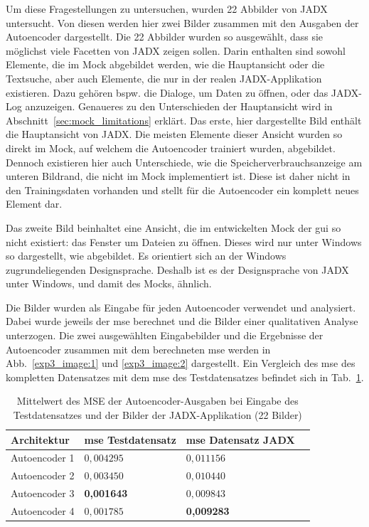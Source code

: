 Um diese Fragestellungen zu untersuchen, wurden 22 Abbilder von JADX untersucht. Von diesen werden hier zwei Bilder zusammen mit den Ausgaben der Autoencoder dargestellt. Die 22 Abbilder wurden so ausgewählt, dass sie möglichst viele Facetten von JADX zeigen sollen. Darin enthalten sind sowohl Elemente, die im Mock abgebildet werden, wie die Hauptansicht oder die Textsuche, aber auch Elemente, die nur in der realen JADX-Applikation existieren. Dazu gehören bspw. die Dialoge, um Daten zu öffnen, oder das JADX-Log anzuzeigen. Genaueres zu den Unterschieden der Hauptansicht wird in Abschnitt~\ref{sec:mock_limitations} erklärt. Das erste, hier dargestellte Bild enthält die Hauptansicht von JADX. Die meisten Elemente dieser Ansicht wurden so direkt im Mock, auf welchem die Autoencoder trainiert wurden, abgebildet. Dennoch existieren hier auch Unterschiede, wie die Speicherverbrauchsanzeige am unteren Bildrand, die nicht im Mock implementiert ist. Diese ist daher nicht in den Trainingsdaten vorhanden und stellt für die Autoencoder ein komplett neues Element dar.

Das zweite Bild beinhaltet eine Ansicht, die im entwickelten Mock der \gls{gui} so nicht existiert: das Fenster um Dateien zu öffnen. Dieses wird nur unter Windows so dargestellt, wie abgebildet. Es orientiert sich an der Windows zugrundeliegenden Designsprache. Deshalb ist es der Designsprache von JADX unter Windows, und damit des Mocks, ähnlich.

Die Bilder wurden als Eingabe für jeden Autoencoder verwendet und analysiert. Dabei wurde jeweils der \gls{mse} berechnet und die Bilder einer qualitativen Analyse unterzogen. Die zwei ausgewählten Eingabebilder und die Ergebnisse der Autoencoder zusammen mit dem berechneten \gls{mse} werden in Abb.~\ref{exp3_image:1} und \ref{exp3_image:2} dargestellt.
Ein Vergleich des \gls{mse} des kompletten Datensatzes mit dem \gls{mse} des Testdatensatzes befindet sich in Tab.~\ref{tab:exp3results_mse}.

\begin{table}[htbp]
    \centering
    \caption{Mittelwert des MSE der Autoencoder-Ausgaben bei Eingabe des Testdatensatzes und der Bilder der JADX-Applikation (22 Bilder)}
    \label{tab:exp3results_mse}
    \smallskip
    \begin{tabular}{ llll }
        \toprule
        Architektur & \gls{mse} Testdatensatz & \gls{mse} Datensatz JADX \\
        \hline
        Autoencoder 1 & $0,004295$ & $0,011156$\\
        Autoencoder 2 & $0,003450$ & $0,010440$\\
        Autoencoder 3 & \textbf{0,001643} & $0,009843$\\
        Autoencoder 4 & $0,001785$ & \textbf{0,009283}\\
        \bottomrule
    \end{tabular}
\end{table}

